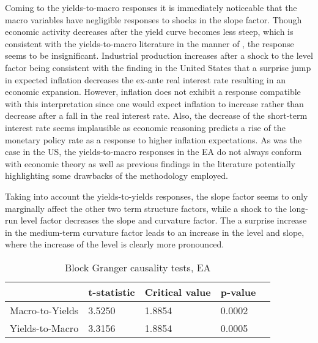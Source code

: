 Coming to the yields-to-macro responses it is immediately noticeable that the macro variables have negligible responses to shocks in the slope factor. Though economic activity decreases after the yield curve becomes less steep, which is consistent with the yields-to-macro literature in the manner of \citet{estrella1991term}, the response seems to be insignificant. 
Industrial production increases after a shock to the level factor being consistent with the finding in the United States that a surprise jump in expected inflation decreases the ex-ante real interest rate resulting in an economic expansion. 
However, inflation does not exhibit a response compatible with this interpretation 
since one would expect inflation to increase rather than decrease after a fall in the real interest rate.
Also, the decrease of the short-term interest rate seems implausible as economic reasoning predicts a rise of the monetary policy rate as a response to higher inflation expectations. 
As was the case in the US, the yields-to-macro responses in the EA do not always conform with economic theory as well as previous findings in the literature potentially highlighting some drawbacks of the methodology employed. 

Taking into account the yields-to-yields responses, the slope factor seems to only marginally affect the other two term structure factors, while a shock to the long-run level factor decreases the slope and curvature factor.
The a surprise increase in the medium-term curvature factor leads to an increase in the level and slope, where the increase of the level is clearly more pronounced.



\begin{table}[!t]
    \centering
    \begin{tabular}{lllll}
    \toprule
    {} &     t-statistic &      Critical value &                 p-value 
    \\
    \midrule
    Macro-to-Yields &  3.5250 &  1.8854 &  0.0002 &  \\
    Yields-to-Macro &   3.3156 &  1.8854 &  0.0005  \\
\bottomrule
    \end{tabular}
    \caption{Block Granger causality tests, EA}
    \label{tab:granger_ea}
\end{table}


